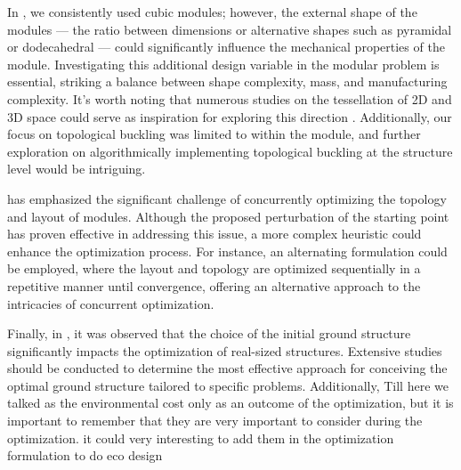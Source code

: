 In , we consistently used cubic modules; however, the external shape of the modules — \ie the ratio between dimensions or alternative shapes such as pyramidal or dodecahedral — could significantly influence the mechanical properties of the module. Investigating this additional design variable in the modular problem is essential, striking a balance between shape complexity, mass, and manufacturing complexity. It's worth noting that numerous studies on the tessellation of 2D and 3D space could serve as inspiration for exploring this direction . Additionally, our focus on topological buckling was limited to within the module, and further exploration on algorithmically implementing topological buckling at the structure level would be intriguing.

 has emphasized the significant challenge of concurrently optimizing the topology and layout of modules. Although the proposed perturbation of the starting point has proven effective in addressing this issue, a more complex heuristic could enhance the optimization process. For instance, an alternating formulation could be employed, where the layout and topology are optimized sequentially in a repetitive manner until convergence, offering an alternative approach to the intricacies of concurrent optimization.

Finally, in , it was observed that the choice of the initial ground structure significantly impacts the optimization of real-sized structures. Extensive studies should be conducted to determine the most effective approach for conceiving the optimal ground structure tailored to specific problems. Additionally, Till here we talked as the environmental cost only as an outcome of the optimization, but it is important to remember that they are very important to consider during the optimization. it could very interesting to add them in the optimization formulation to do eco design 
